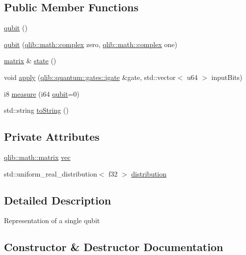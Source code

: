 \subsection*{Public Member Functions}
\begin{DoxyCompactItemize}
\item 
\hyperlink{classqlib_1_1quantum_1_1qubit_a32ca47a6fca663c267ddbbac49b12986}{qubit} ()
\item 
\hyperlink{classqlib_1_1quantum_1_1qubit_a9c84248c8855841087687baa8b0a08c3}{qubit} (\hyperlink{classqlib_1_1math_1_1complex}{qlib\+::math\+::complex} zero, \hyperlink{classqlib_1_1math_1_1complex}{qlib\+::math\+::complex} one)
\item 
\hyperlink{classqlib_1_1math_1_1matrix}{matrix} \& \hyperlink{classqlib_1_1quantum_1_1qubit_af8eaf337ffcb95c2445ddf35189335e4}{state} ()
\item 
void \hyperlink{classqlib_1_1quantum_1_1qubit_ab3b0b76d5c6f0e627a742fcafbc768ae}{apply} (\hyperlink{classqlib_1_1quantum_1_1gates_1_1igate}{qlib\+::quantum\+::gates\+::igate} \&gate, std\+::vector$<$ u64 $>$ input\+Bits)
\item 
i8 \hyperlink{classqlib_1_1quantum_1_1qubit_aaf001eff84ccb4b7a6992e42bc2143cb}{measure} (i64 \hyperlink{classqlib_1_1quantum_1_1qubit}{qubit}=0)
\item 
std\+::string \hyperlink{classqlib_1_1quantum_1_1qubit_a8bf29d1f66508e4878ea861c5d8e44ec}{to\+String} ()
\end{DoxyCompactItemize}
\subsection*{Private Attributes}
\begin{DoxyCompactItemize}
\item 
\hyperlink{classqlib_1_1math_1_1matrix}{qlib\+::math\+::matrix} \hyperlink{classqlib_1_1quantum_1_1qubit_a8f6e33dd5d0673f195360bc4b5c5442f}{vec}
\item 
std\+::uniform\+\_\+real\+\_\+distribution$<$ f32 $>$ \hyperlink{classqlib_1_1quantum_1_1qubit_abb97216eead736ab87e8756b9b4c2ce9}{distribution}
\end{DoxyCompactItemize}


\subsection{Detailed Description}
Representation of a single qubit 

\subsection{Constructor \& Destructor Documentation}
